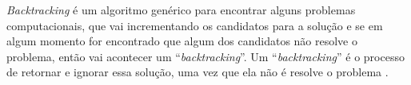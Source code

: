 \emph{Backtracking} é um algoritmo genérico para encontrar alguns
problemas computacionais, que vai incrementando os candidatos para a solução
e se em algum momento for encontrado que algum dos candidatos não resolve
o problema, então vai acontecer um ``\emph{backtracking}''. Um ``\emph{backtracking}''
é o processo de retornar e ignorar essa solução, uma vez que ela não é resolve
o problema \cite{BacktrackingAlgorithmsExplained}.